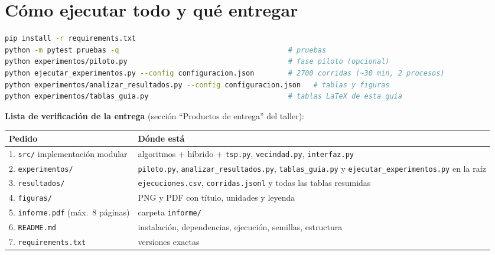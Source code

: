 \documentclass[11pt,a4paper]{article}
\begin{document}
\section{Cómo ejecutar todo y qué entregar}\label{sec:ejecutar}
\begin{lstlisting}[language=bash]
pip install -r requirements.txt
python -m pytest pruebas -q                                        # pruebas
python experimentos/piloto.py                                      # fase piloto (opcional)
python ejecutar_experimentos.py --config configuracion.json        # 2700 corridas (~30 min, 2 procesos)
python experimentos/analizar_resultados.py --config configuracion.json   # tablas y figuras
python experimentos/tablas_guia.py                                 # tablas LaTeX de esta guía
\end{lstlisting}

\textbf{Lista de verificación de la entrega} (sección ``Productos de entrega'' del taller):
\begin{center}\small
\begin{tabular}{>{\raggedright}p{5.2cm}>{\raggedright\arraybackslash}p{9.6cm}}
\toprule
Pedido & Dónde está \\
\midrule
1. \texttt{src/} implementación modular & 5 algoritmos + híbrido + \texttt{tsp.py}, \texttt{vecindad.py}, \texttt{interfaz.py}\\
2. \texttt{experimentos/} & \texttt{piloto.py}, \texttt{analizar\_resultados.py}, \texttt{tablas\_guia.py} y \texttt{ejecutar\_experimentos.py} en la raíz\\
3. \texttt{resultados/} & \texttt{ejecuciones.csv}, \texttt{corridas.jsonl} y todas las tablas resumidas\\
4. \texttt{figuras/} & PNG y PDF con título, unidades y leyenda\\
5. \texttt{informe.pdf} (máx.\ 8 páginas) & carpeta \texttt{informe/}\\
6. \texttt{README.md} & instalación, dependencias, ejecución, semillas, estructura\\
7. \texttt{requirements.txt} & versiones exactas\\
\bottomrule
\end{tabular}
\end{center}

\end{document}
